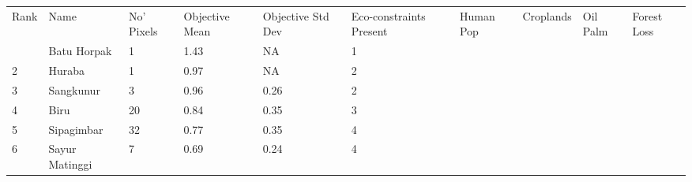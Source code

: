 \begin{table}[ht]
\centering
\begingroup\fontsize{9pt}{10pt}\selectfont
\begin{tabular}{C{0.05\textwidth}C{0.15\textwidth}C{0.08\textwidth}C{0.08\textwidth}C{0.08\textwidth}C{0.08\textwidth}C{0.08\textwidth}C{0.08\textwidth}C{0.08\textwidth}C{0.08\textwidth}}
 Rank & Name & No' Pixels & Objective Mean & Objective Std Dev & Eco-constraints  Present & Human Pop & Croplands & Oil Palm & Forest Loss \\ 
  & Batu Horpak &   1 & \textcolor[HTML]{FFFFFF}{1.43} & \textcolor[HTML]{000000}{  NA} & \textcolor[HTML]{000000}{1} &  &  &  &  \\ 
  {2} & Huraba &   1 & \textcolor[HTML]{000000}{0.97} & \textcolor[HTML]{000000}{  NA} & \textcolor[HTML]{000000}{2} &  &  &  &  \\ 
  {3} & Sangkunur &   3 & \textcolor[HTML]{000000}{0.96} & \textcolor[HTML]{000000}{0.26} & \textcolor[HTML]{000000}{2} &  &  &  &  \\ 
  {4} & Biru &  20 & \textcolor[HTML]{000000}{0.84} & \textcolor[HTML]{FFFFFF}{0.35} & \textcolor[HTML]{000000}{3} &  &  &  &  \\ 
  {5} & Sipagimbar &  32 & \textcolor[HTML]{000000}{0.77} & \textcolor[HTML]{FFFFFF}{0.35} & \textcolor[HTML]{FFFFFF}{4} &  &  &  &  \\ 
  {6} & Sayur Matinggi &   7 & \textcolor[HTML]{000000}{0.69} & \textcolor[HTML]{000000}{0.24} & \textcolor[HTML]{FFFFFF}{4} &  &  &  &  \\ 

\end{tabular}
\end{table}

